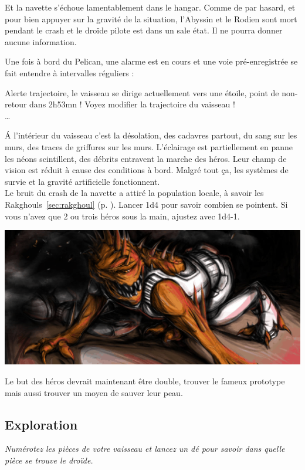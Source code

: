 Et la navette s’échoue lamentablement dans le hangar. Comme de par hasard, et pour bien appuyer sur la gravité de la situation, l’Abyssin et le Rodien sont mort pendant le crash et le droïde pilote est dans un sale état. Il ne pourra donner aucune information.

Une fois à bord du Pelican, une alarme est en cours et une voie pré-enregistrée se fait entendre à intervalles réguliers :

\begin{quotebox}
	Alerte trajectoire, le vaisseau se dirige actuellement vers une étoile, point de non-retour dans 2h53mn ! 
	Voyez modifier la trajectoire du vaisseau !\\ 
	\ldots
\end{quotebox}

\'A l’intérieur du vaisseau c’est la désolation, des cadavres partout, du sang sur les murs, des traces de griffures sur les murs. L’éclairage est partiellement en panne les néons scintillent, des débrits entravent la marche des héros. Leur champ de vision est réduit à cause des conditions à bord. Malgré tout ça, les systèmes de survie et la gravité artificielle fonctionnent.\\

Le bruit du crash de la navette a attiré la population locale, à savoir les Rakghouls~\ref{sec:rakghoul} (p. \pageref{sec:rakghoul}). Lancer 1d4 pour savoir combien se pointent. Si vous n’avez que 2 ou trois héros sous la main, ajustez avec 1d4-1.

\noindent\includegraphics[width=\linewidth]{_img/dos-au-muur/rakghoul.png}

Le but des héros devrait maintenant être double, trouver le fameux prototype mais aussi trouver un moyen de sauver leur peau. 

\subsection{Exploration}
\emph{Numérotez les pièces de votre vaisseau et lancez un dé pour savoir dans quelle pièce se trouve le droïde.}\\

